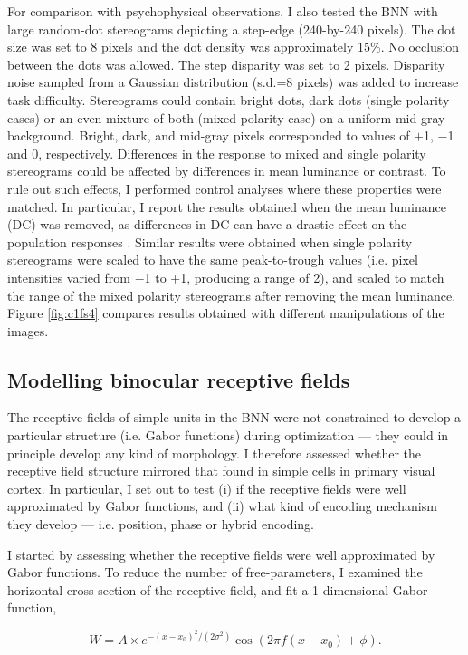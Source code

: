 For comparison with psychophysical observations, I also tested the BNN with large random-dot stereograms depicting a step-edge (240-by-240 pixels). The dot size was set to 8 pixels and the dot density was approximately 15\%. No occlusion between the dots was allowed. The step disparity was set to 2 pixels. Disparity noise sampled from a Gaussian distribution (s.d.=8 pixels) was added to increase task difficulty. Stereograms could contain bright dots, dark dots (single polarity cases) or an even mixture of both (mixed polarity case) on a uniform mid-gray background. Bright, dark, and mid-gray pixels corresponded to values of $+$1, $-$1 and 0, respectively. Differences in the response to mixed and single polarity stereograms could be affected by differences in mean luminance or contrast. To rule out such effects, I performed control analyses where these properties were matched. In particular, I report the results obtained when the mean luminance (DC) was removed, as differences in DC can have a drastic effect on the population responses \cite{Read:2011im}. Similar results were obtained when single polarity stereograms were scaled to have the same peak-to-trough values (i.e. pixel intensities varied from $-$1 to $+$1, producing a range of 2), and scaled to match the range of the mixed polarity stereograms after removing the mean luminance. Figure \ref{fig:c1fs4} compares results obtained with different manipulations of the images.

\subsection*{Modelling binocular receptive fields}

The receptive fields of simple units in the BNN were not constrained to develop a particular structure (i.e. Gabor functions) during optimization --- they could in principle develop any kind of morphology. I therefore assessed whether the receptive field structure mirrored that found in simple cells in primary visual cortex. In particular, I set out to test (i) if the receptive fields were well approximated by Gabor functions, and (ii) what kind of encoding mechanism they develop --- i.e. position, phase or hybrid encoding. 

I started by assessing whether the receptive fields were well approximated by Gabor functions. To reduce the number of free-parameters, I examined the horizontal cross-section of the receptive field, and fit a 1-dimensional Gabor function,

\begin{equation}
  W = A \times e^{-(x-x_0)^2/(2 \sigma ^2)} \cos⁡ (2 \pi f(x-x_0)+\phi).
\end{equation}

